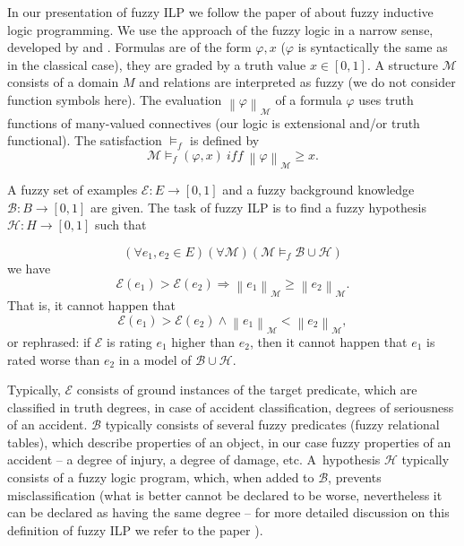 In our presentation of fuzzy ILP we follow the paper of 
\cite{biblio:FILP} about fuzzy inductive logic programming.
We use the approach of the fuzzy logic in a narrow sense, developed by 
\cite{biblio:Pavelka} and 
\cite{biblio:Hajek}. Formulas are of the form $\varphi, x$ ($\varphi$ is syntactically the same as in the classical case), they are graded by a truth value $x\in [0,1]$.
A structure ${\mathcal M}$ consists of a domain $M$ and relations are interpreted as fuzzy (we do not consider function symbols here). The evaluation $\left\|\varphi\right\|_{{\mathcal M}}$ of a formula $\varphi$ uses truth functions of many-valued connectives (our logic is extensional and/or truth functional). The satisfaction $\models_f$ is defined by
$$
{\mathcal M}\models_f (\varphi, x)\ iff\ \left\|\varphi\right\|_{{\mathcal M}}\ge x.
$$

\begin{definition}
A fuzzy set of examples ${\mathcal E}:E\longrightarrow [0,1]$ and a fuzzy background knowledge ${\mathcal B}:B\longrightarrow [0,1]$ are given. The task of fuzzy ILP is to find a fuzzy hypothesis ${\mathcal H}:H\longrightarrow [0,1]$ such that 

$$
(\forall e_1,e_2\in E)(\forall {\mathcal M})({\mathcal M}\models_f {\mathcal B}\cup {\mathcal H})
$$
we have
$$
{\mathcal E}(e_1)>{\mathcal E}(e_2)\Rightarrow \left\|e_1\right\|_{{\mathcal M}}\ge \left\|e_2\right\|_{{\mathcal M}}.
$$
That is, it cannot happen that
$$
{\mathcal E}(e_1)>{\mathcal E}(e_2) \wedge \left\|e_1\right\|_{{\mathcal M}}< \left\|e_2\right\|_{{\mathcal M}},
$$
or rephrased: if ${\mathcal E}$ is rating $e_1$ higher than $e_2$, then it cannot happen that $e_1$ is rated worse than $e_2$ in a model of ${\mathcal B}\cup {\mathcal H}$.
\end{definition}

Typically, ${\mathcal E}$ consists of ground instances of the target predicate, which are classified in truth degrees, in case of accident classification, degrees of seriousness of an accident. ${\mathcal B}$ typically consists of several fuzzy predicates (fuzzy relational tables), which describe properties of an object, in our case fuzzy properties of an accident -- a degree of injury, a degree of damage, etc. 
A~hypothesis ${\mathcal H}$ typically consists of a fuzzy logic program, which, when added to ${\mathcal B}$, prevents misclassification (what is better cannot be declared to be worse, nevertheless it can be declared as having the same degree -- for more detailed discussion on this definition of fuzzy ILP we refer to the paper \citep{biblio:FILP}).


